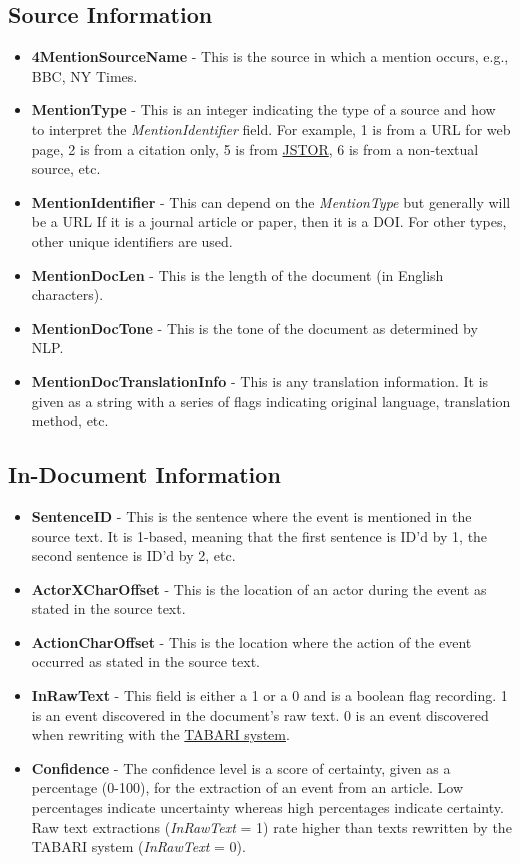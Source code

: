\subsection{Source Information}
   \begin{itemize} 
     \item \textbf{4MentionSourceName} - This is the source in which a mention occurs, e.g., BBC, NY Times.
     \item \textbf{MentionType} - This is an integer indicating the type of a source and how to interpret the \textit{MentionIdentifier} field. For example, 1 is from a URL for web page, 2 is from a citation only, 5 is from \href{https://about.jstor.org}{JSTOR}, 6 is from a non-textual source, etc.
     \item \textbf{MentionIdentifier} - This can depend on the \textit{MentionType} but generally will be a URL If it is a journal article or paper, then it is a DOI. For other types, other unique identifiers are used.
     \item \textbf{MentionDocLen} - This is the length of the document (in English characters). 
     \item \textbf{MentionDocTone} - This is the tone of the document as determined by NLP.
     \item \textbf{MentionDocTranslationInfo} - This is any translation information. It is given as a string with a series of flags indicating original language, translation method, etc. %
   \end{itemize}

  
\subsection{In-Document Information}
\begin{itemize} 
   \item \textbf{SentenceID} - This is the sentence where the event is mentioned in the source text. It is 1-based, meaning that the first sentence is ID'd by 1, the second sentence is ID'd by 2, etc.
   \item \textbf{ActorXCharOffset} - This is the location of an actor during the event as stated in the source text. 
   \item \textbf{ActionCharOffset} - This is the location where the action of the event occurred as stated in the source text.
   \item \textbf{InRawText} - This field is either a 1 or a 0 and is a boolean flag recording. 1 is an event discovered in the document's raw text. 0 is an event discovered when rewriting with the \href{https://parusanalytics.com/eventdata/software.dir/tabari.info.html}{TABARI system}. %
   \item \textbf{Confidence} - The confidence level is a score of certainty, given as a percentage (0-100), for the extraction of an event from an article. Low percentages indicate uncertainty whereas high percentages indicate certainty. Raw text extractions (\textit{InRawText} = 1) rate higher than texts rewritten by the TABARI system (\textit{InRawText} = 0).
\end{itemize}
